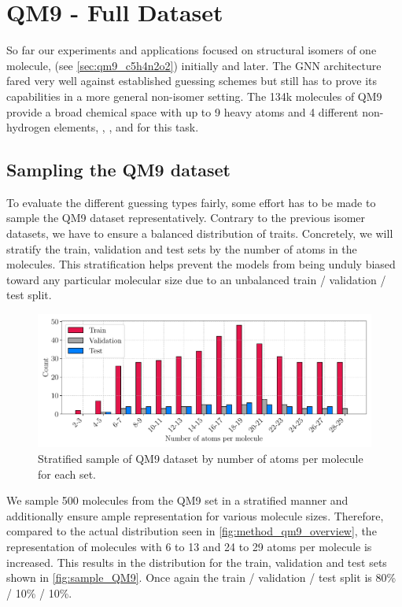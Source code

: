 \section{QM9 - Full Dataset}
\label{sec:qm9_isomers_benchmark}
So far our experiments and applications focused on structural isomers of one molecule,  (see \autoref{sec:qm9_c5h4n2o2}) initially and  later. The GNN architecture fared very well against established guessing schemes but still has to prove its capabilities in a more general non-isomer setting. The 134k molecules of QM9 \parencite{ref:data_qm9} provide a broad chemical space with up to 9 heavy atoms and 4 different non-hydrogen elements, , ,  and  for this task. 
\subsection{Sampling the QM9 dataset}
\label{sec:qm9_full_isomers_sampling}
To evaluate the different guessing types fairly, some effort has to be made to sample the QM9 dataset representatively. Contrary to the previous isomer datasets, we have to ensure a balanced distribution of traits. Concretely, we will stratify the train, validation and test sets by the number of atoms in the molecules. This stratification helps prevent the models from being unduly biased toward any particular molecular size due to an unbalanced train / validation / test split.
\begin{figure}[h]
    \centering
    \includegraphics[width=\textwidth]{../fig/application/strat_sample.pdf}
    \caption[Stratified sample of QM9 dataset]{Stratified sample of QM9 dataset by number of atoms per molecule for each set.}
    \label{fig:sample_QM9}
\end{figure}
We sample 500 molecules from the QM9 set in a stratified manner and additionally ensure ample representation for various molecule sizes. Therefore, compared to the actual distribution seen in \autoref{fig:method_qm9_overview}, the representation of molecules with 6 to 13 and 24 to 29 atoms per molecule is increased. This results in the distribution for the train, validation and test sets shown in \autoref{fig:sample_QM9}. Once again the train / validation / test split is 80\% / 10\% / 10\%.\\

